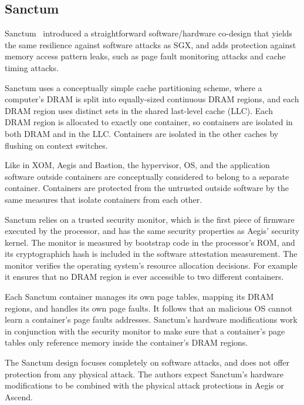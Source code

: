 \subsection{Sanctum}
\label{sec:related_sanctum}

Sanctum~\cite{costan2015sanctum} introduced a straightforward software/hardware
co-design that yields the same resilience against software attacks as SGX, and
adds protection against memory access pattern leaks, such as page fault
monitoring attacks and cache timing attacks.

Sanctum uses a conceptually simple cache partitioning scheme, where a
computer's DRAM is split into equally-sized continuous DRAM regions, and each
DRAM region uses distinct sets in the shared last-level cache (LLC). Each DRAM
region is allocated to exactly one container, so containers are isolated in
both DRAM and in the LLC. Containers are isolated in the other caches by
flushing on context switches.

Like in XOM, Aegis and Bastion, the hypervisor, OS, and the application
software outside containers are conceptually considered to belong to a separate
container. Containers are protected from the untrusted outside software by the
same measures that isolate containers from each other.

Sanctum relies on a trusted security monitor, which is the first piece of
firmware executed by the processor, and has the same security properties as
Aegis' security kernel. The monitor is measured by bootstrap code in the
processor's ROM, and its cryptographich hash is included in the software
attestation measurement. The monitor verifies the operating system's resource
allocation decisions. For example it ensures that no DRAM region is ever
accessible to two different containers.

Each Sanctum container manages its own page tables, mapping its DRAM regions,
and handles its own page faults. It follows that an malicious OS cannot learn
a container's page faults addresses. Sanctum's hardware modifications work in
conjunction with the security monitor to make sure that a container's page
tables only reference memory inside the container's DRAM regions.

The Sanctum design focuses completely on software attacks, and does not offer
protection from any physical attack. The authors expect Sanctum's hardware
modifications to be combined with the physical attack protections in Aegis or
Ascend.
